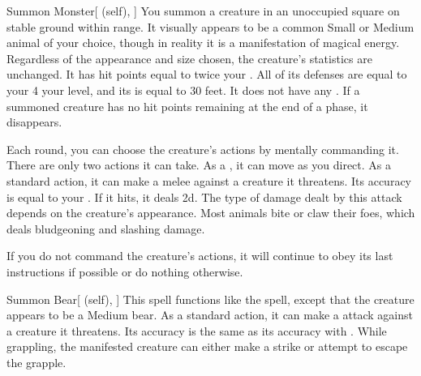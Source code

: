 \lowercase{\hypertarget{spell:Summon Monster}{}}\label{spell:Summon Monster}
\begin{attuneability}[\nth{1}]{\hypertarget{spell:Summon Monster}{Summon Monster}}[ (self), ]
You summon a creature in an unoccupied square on stable ground within \rngmed range.
It visually appears to be a common Small or Medium animal of your choice, though in reality it is a manifestation of magical energy.
Regardless of the appearance and size chosen, the creature's statistics are unchanged.
It has hit points equal to twice your .
All of its defenses are equal to your 4 \add your level, and its  is equal to 30 feet.
It does not have any .
If a summoned creature has no hit points remaining at the end of a phase, it disappears.

Each round, you can choose the creature's actions by mentally commanding it.
There are only two actions it can take.
As a , it can move as you direct.
As a standard action, it can make a melee  against a creature it threatens.
Its accuracy is equal to your .
If it hits, it deals  \minus2d.
The type of damage dealt by this attack depends on the creature's appearance.
Most animals bite or claw their foes, which deals bludgeoning and slashing damage.

If you do not command the creature's actions, it will continue to obey its last instructions if possible or do nothing otherwise.
\end{attuneability}
\vspace{0.25em}



\lowercase{\hypertarget{spell:Summon Bear}{}}\label{spell:Summon Bear}
\begin{attuneability}[\nth{2}]{\hypertarget{spell:Summon Bear}{Summon Bear}}[ (self), ]
This spell functions like the  spell, except that the creature appears to be a Medium bear.
As a standard action, it can make a  attack against a creature it threatens.
Its accuracy is the same as its accuracy with .
While grappling, the manifested creature can either make a strike or attempt to escape the grapple.
\end{attuneability}
\vspace{0.25em}



